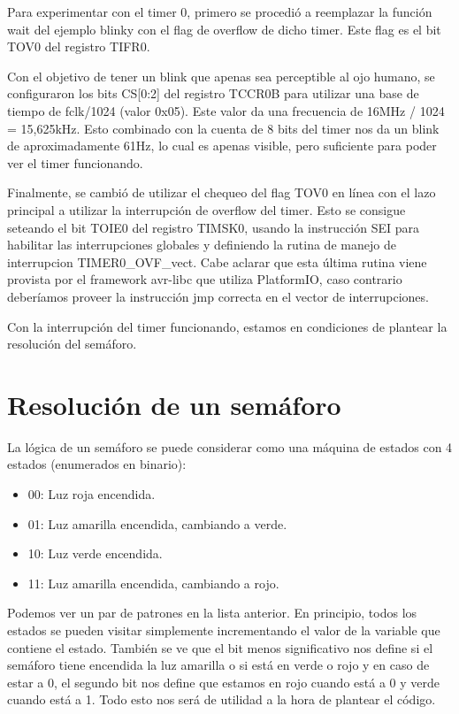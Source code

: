 \documentclass{article}
\begin{document}
Para experimentar con el timer 0, primero se procedió a reemplazar la función
wait del ejemplo blinky con el flag de overflow de dicho timer. Este flag es
el bit TOV0 del registro TIFR0.

Con el objetivo de tener un blink que apenas sea perceptible al ojo humano, se
configuraron los bits CS[0:2] del registro TCCR0B para utilizar una base de
tiempo de fclk/1024 (valor 0x05). Este valor da una frecuencia de
16MHz / 1024 = 15,625kHz. Esto combinado con la cuenta de 8 bits del timer nos
da un blink de aproximadamente 61Hz, lo cual es apenas visible, pero suficiente
para poder ver el timer funcionando.

Finalmente, se cambió de utilizar el chequeo del flag TOV0 en línea con el lazo
principal a utilizar la interrupción de overflow del timer. Esto se consigue
seteando el bit TOIE0 del registro TIMSK0, usando la instrucción SEI para
habilitar las interrupciones globales y definiendo la rutina de manejo de
interrupcion TIMER0{\_}OVF{\_}vect. Cabe aclarar que esta última rutina viene
provista por el framework avr-libc que utiliza PlatformIO, caso contrario
deberíamos proveer la instrucción jmp correcta en el vector de interrupciones.

Con la interrupción del timer funcionando, estamos en condiciones de plantear
la resolución del semáforo.

\section{Resolución de un semáforo}

La lógica de un semáforo se puede considerar como una máquina de estados con
4 estados (enumerados en binario):

\begin{itemize}
    \item 00: Luz roja encendida.
    \item 01: Luz amarilla encendida, cambiando a verde.
    \item 10: Luz verde encendida.
    \item 11: Luz amarilla encendida, cambiando a rojo.
\end{itemize}

Podemos ver un par de patrones en la lista anterior.
En principio, todos los estados se pueden visitar simplemente incrementando el
valor de la variable que contiene el estado.
También se ve que el bit menos significativo nos define si el semáforo tiene
encendida la luz amarilla o si está en verde o rojo y en caso de estar a 0,
el segundo bit nos define que estamos en rojo cuando está a 0 y verde cuando
está a 1.
Todo esto nos será de utilidad a la hora de plantear el código.
\end{document}
